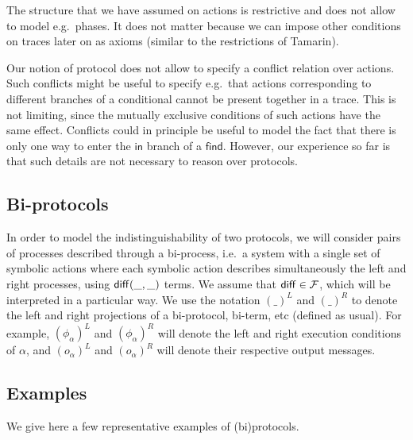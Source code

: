 \begin{remark}
  The structure that we have assumed on actions is restrictive and
  does not allow to model e.g.\ phases. It does not matter because we can
  impose other conditions on traces later on as axioms (similar to the
  restrictions of Tamarin). 
\end{remark}

\begin{remark}
  Our notion of protocol does not allow to specify a conflict relation
  over actions. Such conflicts might be useful to specify e.g.\ that
  actions corresponding to different branches of a conditional cannot
  be present together in a trace. This is not limiting, since the
  mutually exclusive conditions of such actions have the same effect.
  Conflicts could in principle be useful to model the fact that there is only
  one way to enter the $\mathsf{in}$ branch of a $\mathsf{find}$. However,
  our experience so far is that such details are not necessary to reason
  over protocols. 
\end{remark}

\subsection{Bi-protocols}

In order to model the indistinguishability of two protocols, we will
consider pairs of processes described through a bi-process, i.e.\ a system with
a single set of symbolic actions where each symbolic action describes
simultaneously the left and right processes, using $\mathsf{diff}(\_,\_)$ terms.
We assume that $\mathsf{diff} \in \mathcal{F}$,
which will be interpreted in a particular way. 
We use the notation $(\_)^L$ and $(\_)^R$ to denote the left and right
projections of a bi-protocol, bi-term, etc (defined as usual).
For example, $(\phi_{\alpha})^L$ and $(\phi_{\alpha})^R$ will denote
the left and right execution conditions of $\alpha$, and
$(o_{\alpha})^L$ and $(o_{\alpha})^R$ will denote their respective
output messages.

\subsection{Examples}

We give here a few representative examples of (bi)protocols.


